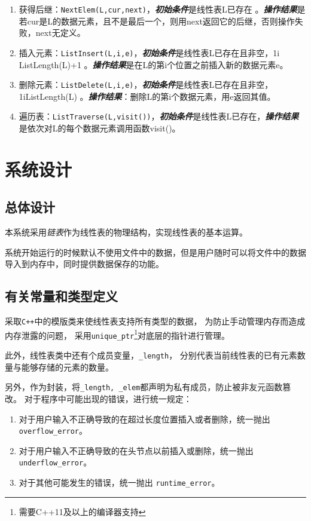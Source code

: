\begin{enumerate}
\item 获得后继：\texttt{NextElem(L,cur,next)}，\newline \textbf{\emph{初始条件}}是线性表L已存在 。\newline \textbf{\emph{操作结果}}是若cur是L的数据元素，且不是最后一个，则用next返回它的后继，否则操作失败，next无定义。
\item 插入元素：\texttt{ListInsert(L,i,e)}，\newline \textbf{\emph{初始条件}}是线性表L已存在且非空，1\le i \le ListLength(L)+1 。\newline \textbf{\emph{操作结果}}是在L的第i个位置之前插入新的数据元素e。
\item 删除元素：\texttt{ListDelete(L,i,e)}，\newline \textbf{\emph{初始条件}}是线性表L已存在且非空，1\le i\le ListLength(L) 。\newline \textbf{\emph{操作结果}}：删除L的第i个数据元素，用e返回其值。
\item 遍历表：\texttt{ListTraverse(L,visit())}，\newline \textbf{\emph{初始条件}}是线性表L已存在，\newline \textbf{\emph{操作结果}}是依次对L的每个数据元素调用函数visit()。
\end{enumerate}
\section{系统设计}
\subsection{总体设计}
本系统采用\emph{链表}作为线性表的物理结构，实现线性表的基本运算。
\par
系统开始运行的时候默认不使用文件中的数据，但是用户随时可以将文件中的数据导入到内存中，同时提供数据保存的功能。
\subsection{有关常量和类型定义}
采取\texttt{C++}中的模版类来使线性表支持所有类型的数据，
为防止手动管理内存而造成内存泄露的问题，
采用\texttt{unique\_ptr}\footnote{需要C++11及以上的编译器支持}对底层的指针进行管理。
\par
此外，线性表类中还有个成员变量，\texttt{\_length}，
分别代表当前线性表的已有元素数量与能够存储的元素的数量。
\par
另外，作为封装，将\texttt{\_length, \_elem}都声明为私有成员，防止被非友元函数篡改。
对于程序中可能出现的错误，进行统一规定：
\begin{enumerate}
    \item 对于用户输入不正确导致的在超过长度位置插入或者删除，统一抛出\texttt{overflow\_error}。
    \item 对于用户输入不正确导致的在头节点以前插入或删除，统一抛出  \texttt{underflow\_error}。
    \item 对于其他可能发生的错误，统一抛出  \texttt{runtime\_error}。
\end{enumerate}
